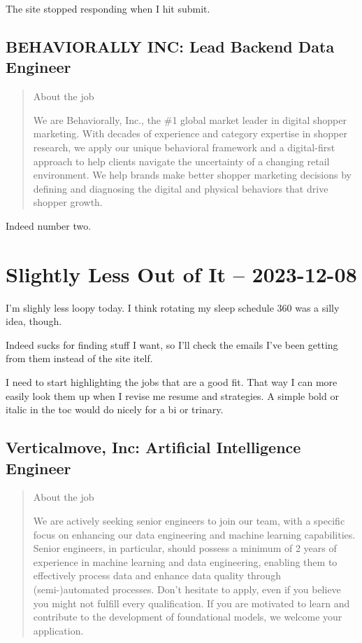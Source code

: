 \documentclass[
	letterpaper, %
	12pt, %
]{CSSullivanBusinessReport}
\begin{document}
The site stopped responding when I hit submit. 

\subsection[BEHAVIORALLY INC]{BEHAVIORALLY INC: Lead Backend Data Engineer}

\begin{quote}
	About the job
	
	We are Behaviorally, Inc., the \#1 global market leader in digital shopper marketing. With decades of experience and category expertise in shopper research, we apply our unique behavioral framework and a digital-first approach to help clients navigate the uncertainty of a changing retail environment. We help brands make better shopper marketing decisions by defining and diagnosing the digital and physical behaviors that drive shopper growth. 

\end{quote}

Indeed number two.  


\section[8 Dec: Indeed Emails]{Slightly Less Out of It -- 2023-12-08} %

I'm slighly less loopy today. I think rotating my sleep schedule 360 was a silly idea, though. 

Indeed sucks for finding stuff I want, so I'll check the emails I've been getting from them instead of the site itelf. 

I need to start highlighting the jobs that are a good fit. That way I can more easily look them up when I revise me resume and strategies. A simple bold or italic in the toc would do nicely for a bi or trinary.


\subsection[Verticalmove, Inc]{Verticalmove, Inc: Artificial Intelligence Engineer}

\begin{quote}
	About the job
	
	We are actively seeking senior engineers to join our team, with a specific focus on enhancing our data engineering and machine learning capabilities. Senior engineers, in particular, should possess a minimum of 2 years of experience in machine learning and data engineering, enabling them to effectively process data and enhance data quality through (semi-)automated processes. Don't hesitate to apply, even if you believe you might not fulfill every qualification. If you are motivated to learn and contribute to the development of foundational models, we welcome your application.

\end{quote}
\end{document}
